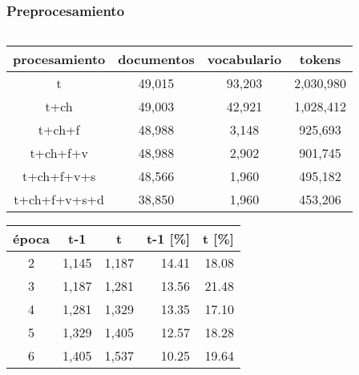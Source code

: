 \documentclass[
	spanish, %
	aspectratio=43, %
	hyperref={pdfencoding=auto,psdextra},
	xcolor={dvipsnames,table,usenames},
]{beamer}
\begin{document}
\begin{frame}[t]
\frametitle{Preprocesamiento}
\begin{columns}[t]
\begin{column}{0.5\textwidth}
\begin{table}[H]
    \begin{tabular}{|c|c|c|c|}
    \hline
    procesamiento & documentos & vocabulario & tokens  \\ \hline
    t             & 49,015      & 93,203       & 2,030,980 \\ \hline
    t+ch          & 49,003      & 42,921       & 1,028,412 \\ \hline
    t+ch+f        & 48,988      & 3,148        & 925,693  \\ \hline
    t+ch+f+v      & 48,988      & 2,902        & 901,745  \\ \hline
    t+ch+f+v+s    & 48,566      & 1,960        & 495,182  \\ \hline
    t+ch+f+v+s+d  & 38,850      & 1,960        & 453,206  \\ \hline
    \end{tabular}
\end{table}

\begin{table}[H]
    \begin{tabular}{|c|r|r|r|r|}
    \hline
    \textbf{época} & \multicolumn{1}{c|}{\textbf{t-1}} & \multicolumn{1}{c|}{\textbf{t}} & \multicolumn{1}{c|}{\textbf{t-1 {[}\%{]}}} & \multicolumn{1}{l|}{\textbf{t {[}\%{]}}} \\ \hline
    2              & 1,145                              & 1,187                            & 14.41                                      & 18.08                                    \\ \hline
    3              & 1,187                              & 1,281                            & 13.56                                      & 21.48                                    \\ \hline
    4              & 1,281                              & 1,329                            & 13.35                                      & 17.10                                    \\ \hline
    5              & 1,329                              & 1,405                            & 12.57                                      & 18.28                                    \\ \hline
    6              & 1,405                              & 1,537                            & 10.25                                      & 19.64                                    \\ \hline
    \end{tabular}
\end{table}
\end{column}


\end{columns}
\end{frame}
\end{document}
